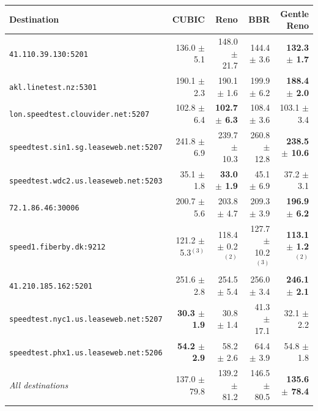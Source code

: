 \begin{tabular}{>{\raggedright\arraybackslash}p{5.4cm}rrrr}
\toprule
Destination & \textbf{CUBIC} & \textbf{Reno} & \textbf{BBR} & \textbf{Gentle Reno} \\
\midrule
\texttt{41.\allowbreak{}110.\allowbreak{}39.\allowbreak{}130:5201} & 136.0 $\pm$ 5.1 & 148.0 $\pm$ 21.7 & 144.4 $\pm$ 3.6 & \textbf{132.3 $\pm$ 1.7} \\
\texttt{akl.\allowbreak{}linetest.\allowbreak{}nz:5301} & 190.1 $\pm$ 2.3 & 190.1 $\pm$ 1.6 & 199.9 $\pm$ 6.2 & \textbf{188.4 $\pm$ 2.0} \\
\texttt{lon.\allowbreak{}speedtest.\allowbreak{}clouvider.\allowbreak{}net:5207} & 102.8 $\pm$ 6.4 & \textbf{102.7 $\pm$ 6.3} & 108.4 $\pm$ 3.6 & 103.1 $\pm$ 3.4 \\
\texttt{speedtest.\allowbreak{}sin1.\allowbreak{}sg.\allowbreak{}leaseweb.\allowbreak{}net:5207} & 241.8 $\pm$ 6.9 & 239.7 $\pm$ 10.3 & 260.8 $\pm$ 12.8 & \textbf{238.5 $\pm$ 10.6} \\
\texttt{speedtest.\allowbreak{}wdc2.\allowbreak{}us.\allowbreak{}leaseweb.\allowbreak{}net:5203} & 35.1 $\pm$ 1.8 & \textbf{33.0 $\pm$ 1.9} & 45.1 $\pm$ 6.9 & 37.2 $\pm$ 3.1 \\
\texttt{72.\allowbreak{}1.\allowbreak{}86.\allowbreak{}46:30006} & 200.7 $\pm$ 5.6 & 203.8 $\pm$ 4.7 & 209.3 $\pm$ 3.9 & \textbf{196.9 $\pm$ 6.2} \\
\texttt{speed1.\allowbreak{}fiberby.\allowbreak{}dk:9212} & 121.2 $\pm$ 5.3$^{(3)}$ & 118.4 $\pm$ 0.2$^{(2)}$ & 127.7 $\pm$ 10.2$^{(3)}$ & \textbf{113.1 $\pm$ 1.2$^{(2)}$} \\
\texttt{41.\allowbreak{}210.\allowbreak{}185.\allowbreak{}162:5201} & 251.6 $\pm$ 2.8 & 254.5 $\pm$ 5.4 & 256.0 $\pm$ 3.4 & \textbf{246.1 $\pm$ 2.1} \\
\texttt{speedtest.\allowbreak{}nyc1.\allowbreak{}us.\allowbreak{}leaseweb.\allowbreak{}net:5207} & \textbf{30.3 $\pm$ 1.9} & 30.8 $\pm$ 1.4 & 41.3 $\pm$ 17.1 & 32.1 $\pm$ 2.2 \\
\texttt{speedtest.\allowbreak{}phx1.\allowbreak{}us.\allowbreak{}leaseweb.\allowbreak{}net:5206} & \textbf{54.2 $\pm$ 2.9} & 58.2 $\pm$ 2.6 & 64.4 $\pm$ 3.9 & 54.8 $\pm$ 1.8 \\
\midrule
\textit{All destinations} & 137.0 $\pm$ 79.8 & 139.2 $\pm$ 81.2 & 146.5 $\pm$ 80.5 & \textbf{135.6 $\pm$ 78.4} \\
\bottomrule
\end{tabular}
